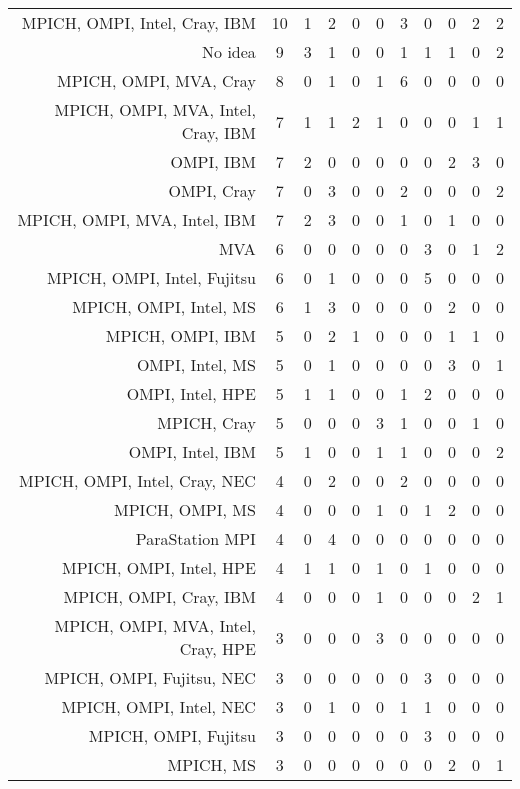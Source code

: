 {\begin{landscape}
\begin{longtable}[htb]{r|c|c|c|c|c|c|c|c|c|c}
{MPICH, OMPI, Intel, Cray, IBM} & 10 & 1 & 2 & 0 & 0 & 3 & 0 & 0 & 2 & 2 \\%
{No idea} & 9 & 3 & 1 & 0 & 0 & 1 & 1 & 1 & 0 & 2 \\%
{MPICH, OMPI, MVA, Cray} & 8 & 0 & 1 & 0 & 1 & 6 & 0 & 0 & 0 & 0 \\%
{MPICH, OMPI, MVA, Intel, Cray, IBM} & 7 & 1 & 1 & 2 & 1 & 0 & 0 & 0 & 1 & 1 \\%
{OMPI, IBM} & 7 & 2 & 0 & 0 & 0 & 0 & 0 & 2 & 3 & 0 \\%
{OMPI, Cray} & 7 & 0 & 3 & 0 & 0 & 2 & 0 & 0 & 0 & 2 \\%
{MPICH, OMPI, MVA, Intel, IBM} & 7 & 2 & 3 & 0 & 0 & 1 & 0 & 1 & 0 & 0 \\%
{MVA} & 6 & 0 & 0 & 0 & 0 & 0 & 3 & 0 & 1 & 2 \\%
{MPICH, OMPI, Intel, Fujitsu} & 6 & 0 & 1 & 0 & 0 & 0 & 5 & 0 & 0 & 0 \\%
{MPICH, OMPI, Intel, MS} & 6 & 1 & 3 & 0 & 0 & 0 & 0 & 2 & 0 & 0 \\%
{MPICH, OMPI, IBM} & 5 & 0 & 2 & 1 & 0 & 0 & 0 & 1 & 1 & 0 \\%
{OMPI, Intel, MS} & 5 & 0 & 1 & 0 & 0 & 0 & 0 & 3 & 0 & 1 \\%
{OMPI, Intel, HPE} & 5 & 1 & 1 & 0 & 0 & 1 & 2 & 0 & 0 & 0 \\%
{MPICH, Cray} & 5 & 0 & 0 & 0 & 3 & 1 & 0 & 0 & 1 & 0 \\%
{OMPI, Intel, IBM} & 5 & 1 & 0 & 0 & 1 & 1 & 0 & 0 & 0 & 2 \\%
{MPICH, OMPI, Intel, Cray, NEC} & 4 & 0 & 2 & 0 & 0 & 2 & 0 & 0 & 0 & 0 \\%
{MPICH, OMPI, MS} & 4 & 0 & 0 & 0 & 1 & 0 & 1 & 2 & 0 & 0 \\%
{ParaStation MPI} & 4 & 0 & 4 & 0 & 0 & 0 & 0 & 0 & 0 & 0 \\%
{MPICH, OMPI, Intel, HPE} & 4 & 1 & 1 & 0 & 1 & 0 & 1 & 0 & 0 & 0 \\%
{MPICH, OMPI, Cray, IBM} & 4 & 0 & 0 & 0 & 1 & 0 & 0 & 0 & 2 & 1 \\%
{MPICH, OMPI, MVA, Intel, Cray, HPE} & 3 & 0 & 0 & 0 & 3 & 0 & 0 & 0 & 0 & 0 \\%
{MPICH, OMPI, Fujitsu, NEC} & 3 & 0 & 0 & 0 & 0 & 0 & 3 & 0 & 0 & 0 \\%
{MPICH, OMPI, Intel, NEC} & 3 & 0 & 1 & 0 & 0 & 1 & 1 & 0 & 0 & 0 \\%
{MPICH, OMPI, Fujitsu} & 3 & 0 & 0 & 0 & 0 & 0 & 3 & 0 & 0 & 0 \\%
{MPICH, MS} & 3 & 0 & 0 & 0 & 0 & 0 & 0 & 2 & 0 & 1 \\%

\end{longtable}
\end{landscape}}
